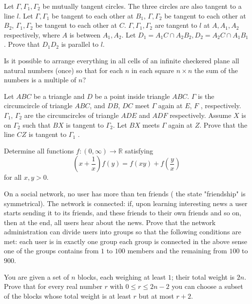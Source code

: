 \documentclass[11pt]{scrartcl}
\begin{document}
\begin{problem}[1121095467606378762]
	Let $\Gamma, \Gamma_1, \Gamma_2$ be mutually tangent circles. The three circles are also tangent to a line $l$. Let $\Gamma, \Gamma_1$ be tangent to each other at $B_1$, $\Gamma, \Gamma_2$ be tangent to each other at $B_2$, $\Gamma_1, \Gamma_2$ be tangent to each other at $C$. $\Gamma, \Gamma_1, \Gamma_2$ are tangent to $l$ at $A, A_1, A_2$ respectively, where $A$ is between $A_1,A_2$. Let $D_1 = A_1C \cap A_2B_2, D_2 = A_2C \cap A_1B_1$. Prove that $D_1D_2$ is parallel to $l$.
\end{problem}
\begin{problem}[3048608408918882691]
	Is it possible to arrange everything in all cells of an infinite checkered plane all natural numbers (once) so that for each $n$ in each square $n \times n$ the sum of the numbers is a multiple of $n$?
\end{problem}
\begin{problem}[6209707374283278028]
Let $ABC$ be a triangle and $D$ be a point inside triangle $ABC$. $\Gamma$ is the circumcircle of triangle $ABC$, and $DB$, $DC$ meet $\Gamma$ again at $E$, $F$ , respectively. $\Gamma_1$, $\Gamma_2$ are the circumcircles of triangle $ADE$ and $ADF$ respectively. Assume $X$ is on $\Gamma_2$ such that $BX$ is tangent to $\Gamma_2$. Let $BX$ meets $\Gamma$ again at $Z$. Prove that the line $CZ$ is tangent to $\Gamma_1$ .
\end{problem}
\begin{problem}[5514383858686655851]
Determine all functions $f:(0,\infty)\to\mathbb{R}$ satisfying$$\left(x+\frac{1}{x}\right)f(y)=f(xy)+f\left(\frac{y}{x}\right)$$for all $x,y>0$.
\end{problem}
\begin{problem}[6029540617185205962]
On a social network, no user has more than ten friends ( the state "friendship" is symmetrical). The network is connected: if, upon learning interesting news a user starts sending it to its friends, and these friends to their own friends and so on, then at the end, all users hear about the news.
Prove that the network administration can divide users into groups so that the following conditions are met:
each user is in exactly one group
each group is connected in the above sense
one of the groups contains from $1$ to $100$ members and the remaining from $100$ to $900$.
\end{problem}
\begin{problem}[37921131297270]
	You are given a set of $n$ blocks, each weighing at least $1$; their total weight is $2n$. Prove that for every real number $r$ with $0 \leq r \leq 2n-2$ you can choose a subset of the blocks whose total weight is at least $r$ but at most $r + 2$.
\end{problem}
\end{document}
